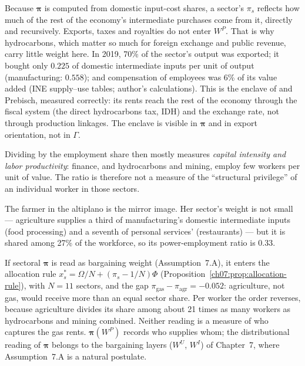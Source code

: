 \documentclass[../structural_economics_book.tex]{subfiles}
\begin{document}
\begin{intuition}
Because $\boldsymbol{\pi}$ is computed from domestic input-cost shares, a sector's $\pi_s$ reflects how much of the rest of the economy's intermediate purchases come from it, directly and recursively. Exports, taxes and royalties do not enter $W^P$. That is why hydrocarbons, which matter so much for foreign exchange and public revenue, carry little weight here. In 2019, 70\% of the sector's output was exported; it bought only $0.225$ of domestic intermediate inputs per unit of output (manufacturing: $0.558$); and compensation of employees was 6\% of its value added (INE supply--use tables; author's calculations). This is the enclave of \citet{pinto1970naturaleza} and Prebisch, measured correctly: its rents reach the rest of the economy through the fiscal system (the direct hydrocarbons tax, IDH) and the exchange rate, not through production linkages. The enclave is visible in $\boldsymbol{\pi}$ and in export orientation, not in $\Gamma$.

Dividing by the employment share then mostly measures \emph{capital intensity and labor productivity}: finance, and hydrocarbons and mining, employ few workers per unit of value. The ratio is therefore not a measure of the ``structural privilege'' of an individual worker in those sectors.

The farmer in the altiplano is the mirror image. Her sector's weight is not small --- agriculture supplies a third of manufacturing's domestic intermediate inputs (food processing) and a seventh of personal services' (restaurants) --- but it is shared among 27\% of the workforce, so its power-employment ratio is $0.33$.

If sectoral $\boldsymbol{\pi}$ is read as bargaining weight (Assumption~7.A), it enters the allocation rule $x_s^* = \Omega/N + (\pi_s - 1/N)\Phi$ (Proposition~\ref{ch07:prop:allocation-rule}), with $N = 11$ sectors, and the gap $\pi_{\text{gas}} - \pi_{\text{agr}} = -0.052$: agriculture, not gas, would receive more than an equal sector share. Per worker the order reverses, because agriculture divides its share among about 21 times as many workers as hydrocarbons and mining combined. Neither reading is a measure of who captures the gas rents. $\boldsymbol{\pi}(W^P)$ records who supplies whom; the distributional reading of $\boldsymbol{\pi}$ belongs to the bargaining layers ($W^U$, $W^I$) of Chapter~7, where Assumption~7.A is a natural postulate.
\end{intuition}
\end{document}
